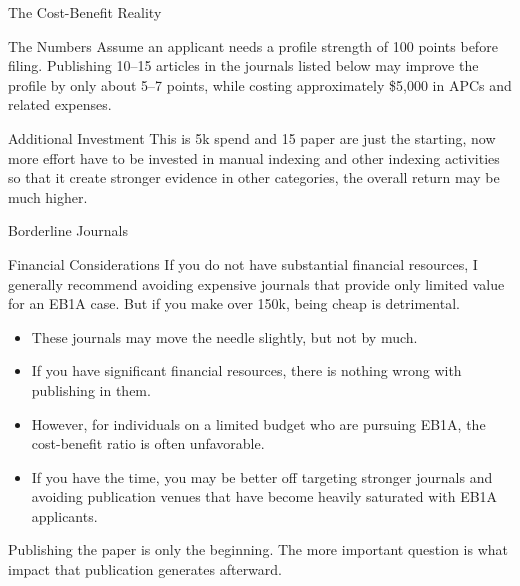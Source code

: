 \documentclass{beamer}
\begin{document}
	\begin{frame}{The Cost-Benefit Reality}
		\begin{alertblock}{The Numbers}
			Assume an applicant needs a profile strength of 100 points before filing. Publishing 10–15 articles in the journals listed below may improve the profile by only about 5–7 points, while costing approximately \$5,000 in APCs and related expenses.
		\end{alertblock}
		\vspace{0.3cm}
		\begin{block}{Additional Investment}
			This is 5k spend and 15 paper are just the starting, now more effort have to be invested in manual indexing and other indexing activities so that it create stronger evidence in other categories, the overall return may be much higher.
		\end{block}
	\end{frame}
	
	\begin{frame}{Borderline Journals}
		\begin{block}{Financial Considerations}
			If you do not have substantial financial resources, I generally recommend avoiding expensive journals that provide only limited value for an EB1A case. But if you make over 150k, being cheap is detrimental.
		\end{block}
		\vspace{0.3cm}
		\begin{itemize}
			\item These journals may move the needle slightly, but not by much.
			\item If you have significant financial resources, there is nothing wrong with publishing in them.
			\item However, for individuals on a limited budget who are pursuing EB1A, the cost-benefit ratio is often unfavorable.
			\item If you have the time, you may be better off targeting stronger journals and avoiding publication venues that have become heavily saturated with EB1A applicants.
		\end{itemize}
		\vspace{0.3cm}
		Publishing the paper is only the beginning. The more important question is what impact that publication generates afterward.
	\end{frame}
	
\end{document}

